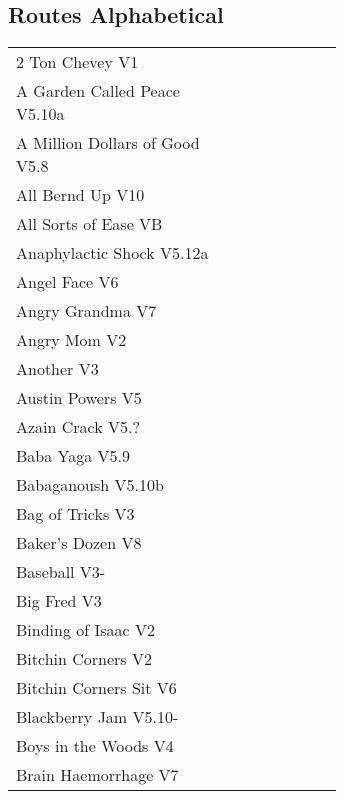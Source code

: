 \twocolumn
{}
\begin{flushleft}
\section{Routes Alphabetical}
\begin{center}
\begin{supertabular}{p{0.65\linewidth}r}
2 Ton Chevey V1 & \pageref{rt:2 Ton Chevey} \\
A Garden Called Peace V5.10a & \pageref{rt:A Garden Called Peace} \\
A Million Dollars of Good V5.8 & \pageref{rt:A Million Dollars of Good} \\
All Bernd Up V10 & \pageref{rt:All Bernd Up} \\
All Sorts of Ease VB & \pageref{rt:All Sorts of Ease} \\
Anaphylactic Shock V5.12a & \pageref{rt:Anaphylactic Shock} \\
Angel Face V6 & \pageref{rt:Angel Face} \\
Angry Grandma V7 & \pageref{rt:Angry Grandma} \\
Angry Mom V2 & \pageref{rt:Angry Mom} \\
Another V3 & \pageref{rt:Another} \\
Austin Powers V5 & \pageref{rt:Austin Powers} \\
Azain Crack V5.? & \pageref{rt:Azain Crack} \\
Baba Yaga V5.9 & \pageref{rt:Baba Yaga} \\
Babaganoush V5.10b & \pageref{rt:Babaganoush} \\
Bag of Tricks V3 & \pageref{vr:Bag of Tricks} \\
Baker's Dozen V8 & \pageref{vr:Baker's Dozen} \\
Baseball V3- & \pageref{rt:Baseball} \\
Big Fred V3 & \pageref{rt:Big Fred} \\
Binding of Isaac V2 & \pageref{rt:Binding of Isaac} \\
Bitchin Corners V2 & \pageref{rt:Bitchin Corners} \\
Bitchin Corners Sit V6 & \pageref{vr:Bitchin Corners Sit} \\
Blackberry Jam V5.10- & \pageref{rt:Blackberry Jam} \\
Boys in the Woods V4 & \pageref{rt:Boys in the Woods} \\
Brain Haemorrhage V7 & \pageref{vr:Brain Haemorrhage} \\

\end{supertabular}
\end{center}
\end{flushleft}
